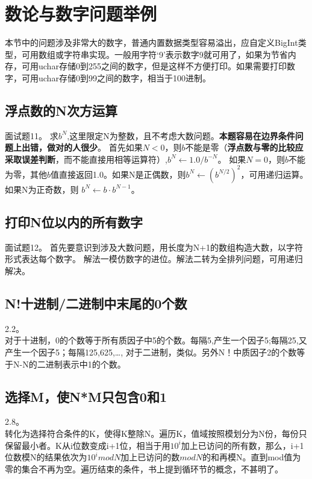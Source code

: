 
\section{数论与数字问题举例}
本节中的问题涉及非常大的数字，普通内置数据类型容易溢出，应自定义BigInt类型，可用数组或字符串实现。一般用字符‘9’表示数字9就可用了，如果为节省内存，可用uchar存储0到255之间的数字，但是这样不方便打印。如果需要打印数字，可用uchar存储0到99之间的数字，相当于100进制。

\subsection{浮点数的N次方运算}
\cite{sword}面试题11。
求$b^N$,这里限定N为整数，且不考虑大数问题。\textbf{本题容易在边界条件问题上出错，做对的人很少}。
首先如果$N<0$，则$b$不能是零（\textbf{浮点数与零的比较应采取误差判断}，而不能直接用相等运算符）,$b^N \gets 1.0 / b^{-N}$。
如果$N=0$，则$b$不能为零，其他$b$值直接返回1.0。如果N是正偶数，则$b^N \gets (b^{N/2})^2$，可用递归运算。如果N为正奇数，则
$b^N \gets b \cdot b^{N-1}$。

\subsection{打印N位以内的所有数字}
\cite{sword}面试题12。
首先要意识到涉及大数问题，用长度为N+1的数组构造大数，以字符形式表达每个数字。
解法一模仿数字的进位。解法二转为全排列问题，可用递归解决。



\subsection{N!十进制/二进制中末尾的0个数}
\cite{bop}2.2。\\
对于十进制，0的个数等于所有质因子中5的个数。每隔5,产生一个因子5;每隔25,又产生一个因子5；每隔125,625,\ldots,
对于二进制，类似。另外N！中质因子2的个数等于N-N的二进制表示中1的个数。
\subsection{选择M，使N*M只包含0和1}
\cite{bop}2.8。\\转化为选择符合条件的K，使得K整除N。遍历K，值域按照模划分为N份，每份只保留最小者。K从i位数变成i+1位，相当于用$10^i$加上已访问的所有数，那么，i+1位数模N的结果依次为$10^i mod N$加上已访问的数$mod N$的和再模N。直到mod值为零的集合不再为空。遍历结束的条件，书上提到循环节的概念，不甚明了。


